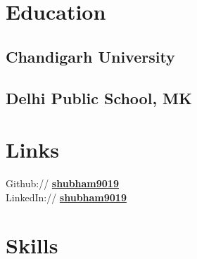 \documentclass[]{deedy-resume-openfont}
\begin{document}
%
%
\lastupdated

%
%

%
%

\begin{minipage}[t]{0.33\textwidth} 


\section{Education} 

\subsection{Chandigarh University}
\sectionsep


\subsection{Delhi Public School, MK}
\sectionsep


\section{Links} 

Github:// \href{https://github.com/shubham9019}{\bf shubham9019} \\
LinkedIn://  \href{https://www.linkedin.com/in/shubham9019}{\bf shubham9019} \\


\section{Skills}

\end{minipage}
\end{document}
